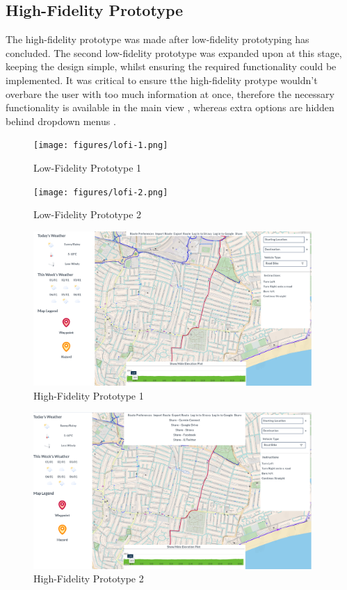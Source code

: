 \subsection{High-Fidelity Prototype}
\label{ui:hi-fi}

The high-fidelity prototype was made after low-fidelity prototyping has concluded. The second low-fidelity prototype was expanded upon at this stage, keeping the design simple, whilst ensuring the required functionality could be implemented. It was critical to ensure tthe high-fidelity protype wouldn't overbare the user with too much information at once, therefore the necessary functionality is available in the main view , whereas extra options are hidden behind dropdown menus .

  \begin{figure}[!ht]
    \centering
    \texttt{[image: figures/lofi-1.png]}
    \caption{Low-Fidelity Prototype 1}
    \label{fig:lofi1}
  \end{figure}

  \begin{figure}[!ht]
    \centering
    \texttt{[image: figures/lofi-2.png]}
    \caption{Low-Fidelity Prototype 2}
    \label{fig:lofi2}
  \end{figure}

  \begin{figure}[!ht]
    \centering
    \includegraphics[width=400px]{figures/hifi-1.png}
    \caption{High-Fidelity Prototype 1}
    \label{fig:hifi1}
  \end{figure}

  \begin{figure}[!ht]
    \centering
    \includegraphics[width=400px]{figures/hifi-2.png}
    \caption{High-Fidelity Prototype 2}
    \label{fig:hifi2}
  \end{figure}

